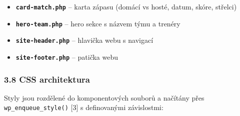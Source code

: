 \begin{itemize}
\tightlist
\item
  \textbf{\texttt{card-match.php}} -- karta zápasu (domácí vs hosté,
  datum, skóre, střelci)
\item
  \textbf{\texttt{hero-team.php}} -- hero sekce s názvem týmu a trenéry
\item
  \textbf{\texttt{site-header.php}} -- hlavička webu s navigací
\item
  \textbf{\texttt{site-footer.php}} -- patička webu
\end{itemize}

\subsubsection{3.8 CSS architektura}\label{css-architektura}

Styly jsou rozdělené do komponentových souborů a načítány přes
\texttt{wp\_enqueue\_style()} {[}3{]} s definovanými závislostmi:

